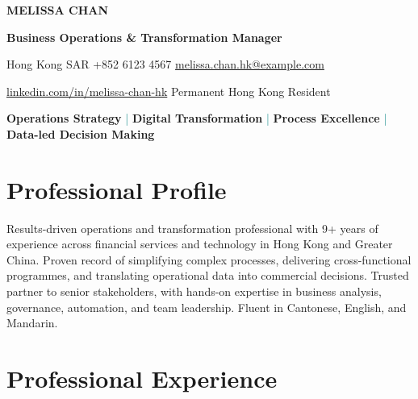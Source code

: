 \documentclass[10pt,a4paper]{article}
\newcommand{\contactsep}{\enspace\textcolor{teal}{\textbullet}\enspace}
\begin{document}
\begin{center}
  {\fontsize{25}{28}\selectfont\bfseries\color{navy} MELISSA CHAN}\par
  \vspace{0.18em}
  {\large\bfseries\color{teal}Business Operations \& Transformation Manager}\par
  \vspace{0.5em}
  {\small
    Hong Kong SAR
    \contactsep +852 6123 4567
    \contactsep \href{mailto:melissa.chan.hk@example.com}{melissa.chan.hk@example.com}\par
    \vspace{0.15em}
    \href{https://www.linkedin.com/in/melissa-chan-hk}{linkedin.com/in/melissa-chan-hk}
    \contactsep Permanent Hong Kong Resident
  }
\end{center}

\vspace{0.25em}
\begin{center}
  \colorbox{soft}{%
    \parbox{0.94\linewidth}{%
      \centering\small\color{navy}
      \textbf{Operations Strategy}\quad
      \textcolor{teal}{|}\quad
      \textbf{Digital Transformation}\quad
      \textcolor{teal}{|}\quad
      \textbf{Process Excellence}\quad
      \textcolor{teal}{|}\quad
      \textbf{Data-led Decision Making}
    }%
  }
\end{center}

\section*{Professional Profile}
Results-driven operations and transformation professional with 9+ years of experience across financial services and technology in Hong Kong and Greater China. Proven record of simplifying complex processes, delivering cross-functional programmes, and translating operational data into commercial decisions. Trusted partner to senior stakeholders, with hands-on expertise in business analysis, governance, automation, and team leadership. Fluent in Cantonese, English, and Mandarin.

\section*{Professional Experience}
\end{document}
